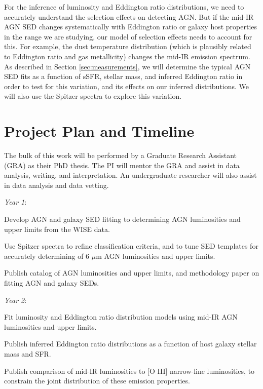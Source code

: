 \documentclass[12pt, preprint]{hacked-aastex}
\newlength{\mylen}
\newenvironment{ditemize}
{ \begin{list}{}{%
\setlength{\topsep}{0pt}%
\setlength{\partopsep}{3pt}%
\setlength{\itemsep}{1pt}\setlength{\parsep}{1pt}%
\setlength{\itemindent}{0pt}\setlength{\listparindent}{12pt}%
\setlength{\leftmargin}{24pt}\setlength{\rightmargin}{0in}%
\setlength{\labelsep}{3pt}\setlength{\labelwidth}{6pt}%
\setlength{\mylen}{3pt}
\renewcommand{\makelabel}{\makebox[\labelwidth][l]{\raisebox{\mylen}{\tiny$\bullet$}\hspace{\fill}}}}}
{\end{list}}
\begin{document}
For the inference of luminosity and Eddington ratio distributions, we
need to accurately understand the selection effects on detecting
AGN. But if the mid-IR AGN SED changes systematically with
Eddington ratio or galaxy host properties in the range we are
studying, our model of selection effects needs to account for
this. For example, the dust temperature distribution (which is
plausibly related to Eddington ratio and gas metallicity) changes the
mid-IR emission spectrum. As described in Section
\ref{sec:measurements}, we will determine the typical AGN SED fits as
a function of sSFR, stellar mass, and inferred Eddington ratio in
order to test for this variation, and its effects on our inferred
distributions.  We will also use the Spitzer spectra to explore this
variation.

\section{Project Plan and Timeline\label{sec:plan}}

The bulk of this work will be performed by a Graduate Research
Assistant (GRA) as their PhD thesis.  The PI will mentor the GRA and 
assist in data analysis, writing, and interpretation. An undergraduate
researcher will also assist in data analysis and data vetting.

\begin{ditemize}
\item {\it Year 1}: 
\begin{ditemize}
\item Develop AGN and galaxy SED fitting to determining AGN
  luminosities and upper limits from the WISE data.
\item Use Spitzer spectra to refine classification criteria, and to
  tune SED templates for accurately determining of 6 $\mu$m AGN
  luminosities and upper limits.
\item Publish catalog of AGN luminosities and upper limits, and
  methodology paper on fitting AGN and galaxy SEDs.
\end{ditemize}
\item {\it Year 2}: 
\begin{ditemize}
\item Fit luminosity and Eddington ratio distribution models using
  mid-IR AGN luminosities and upper limits.
\item Publish inferred Eddington ratio distributions as a function of
  host galaxy stellar mass and SFR.
\item Publish comparison of mid-IR luminosities to [O III] narrow-line
  luminosities, to constrain the joint distribution of these emission
  properties. 
\end{ditemize}
\end{ditemize}
\end{document}
